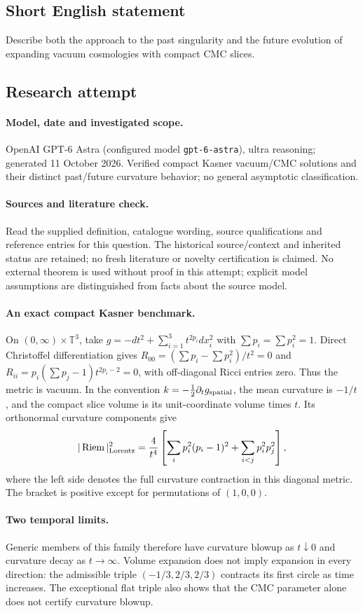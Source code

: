 \documentclass[11pt]{article}
\begin{document}
\subsection{Short English statement}
Describe both the approach to the past singularity and the future evolution of expanding vacuum cosmologies with compact CMC slices.
\subsection{Research attempt}
\paragraph{Model, date and investigated scope.}
OpenAI GPT-6 Astra (configured model \texttt{gpt-6-astra}), ultra reasoning; generated 11 October 2026. Verified compact Kasner vacuum/CMC solutions and their distinct past/future curvature behavior; no general asymptotic classification.

\paragraph{Sources and literature check.}
Read the supplied definition, catalogue wording, source qualifications and reference entries for this question. The historical source/context and inherited status are retained; no fresh literature or novelty certification is claimed. No external theorem is used without proof in this attempt; explicit model assumptions are distinguished from facts about the source model.

\paragraph{An exact compact Kasner benchmark.} On \((0,\infty)\times\mathbb T^3\), take \(g=-dt^2+\sum_{i=1}^3t^{2p_i}dx_i^2\) with \(\sum p_i=\sum p_i^2=1\). Direct Christoffel differentiation gives \(R_{00}=(\sum p_i-\sum p_i^2)/t^2=0\) and \(R_{ii}=p_i(\sum p_j-1)t^{2p_i-2}=0\), with off-diagonal Ricci entries zero. Thus the metric is vacuum. In the convention \(k=-\frac12\partial_tg_{\rm spatial}\), the mean curvature is \(-1/t\), and the compact slice volume is its unit-coordinate volume times \(t\).
Its orthonormal curvature components give
\[
 |\operatorname{Riem}|_{\rm Lorentz}^2
 =\frac4{t^4}\left[\sum_i p_i^2(p_i-1)^2+\sum_{i<j}p_i^2p_j^2\right],
\]
where the left side denotes the full curvature contraction in this diagonal metric. The bracket is positive except for permutations of \((1,0,0)\).
\paragraph{Two temporal limits.} Generic members of this family therefore have curvature blowup as \(t\downarrow0\) and curvature decay as \(t\to\infty\). Volume expansion does not imply expansion in every direction: the admissible triple \((-1/3,2/3,2/3)\) contracts its first circle as time increases. The exceptional flat triple also shows that the CMC parameter alone does not certify curvature blowup.
\end{document}
